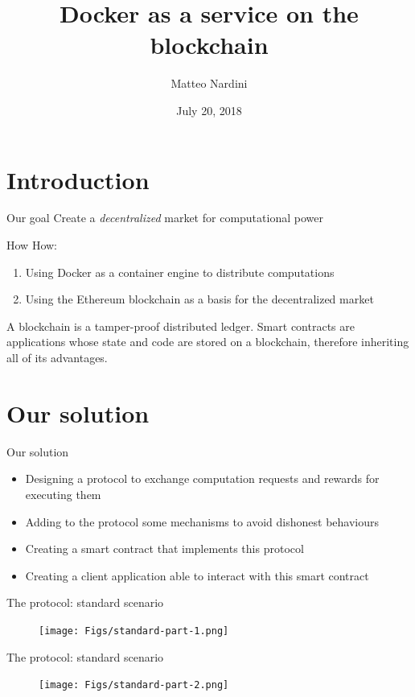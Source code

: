 \documentclass{beamer}
\title{Docker as a service on the blockchain}
\date{July 20, 2018}
\author{Matteo Nardini}
\institute{Free University of Bolzano}
\begin{document}
    \maketitle

    \section{Introduction}
    \begin{frame}{Our goal}
        \centering
        Create a \emph{decentralized} market for computational power
    \end{frame}
    \begin{frame}{How}
        How:
        \begin{enumerate}
            \item Using Docker as a container engine to distribute computations
            \item Using the Ethereum blockchain as a basis for the decentralized market
        \end{enumerate}
        \vspace{1pt}
        A blockchain is a tamper-proof distributed ledger. Smart contracts are applications whose state and code are stored on a blockchain, therefore inheriting all of its advantages.
    \end{frame}

    \section{Our solution}
    \begin{frame}{Our solution}
        \begin{itemize}
            \item Designing a protocol to exchange computation requests and rewards for executing them
            \item Adding to the protocol some mechanisms to avoid dishonest behaviours
            \item Creating a smart contract that implements this protocol
            \item Creating a client application able to interact with this smart contract
        \end{itemize}
    \end{frame}
    \begin{frame}{The protocol: standard scenario}
        \begin{figure}
            \begin{center}
                \texttt{[image: Figs/standard-part-1.png]}
            \end{center}
        \end{figure}
    \end{frame}
    \begin{frame}{The protocol: standard scenario}
        \begin{figure}
            \begin{center}
                \texttt{[image: Figs/standard-part-2.png]}
            \end{center}
        \end{figure}
    \end{frame}
\end{document}
